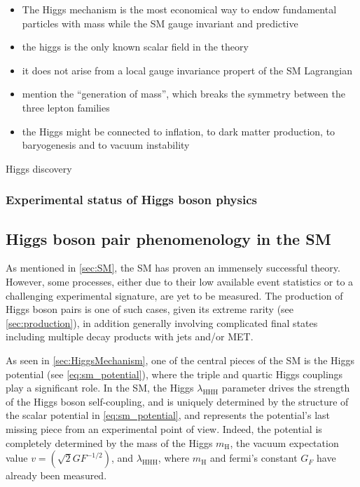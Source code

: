 \documentclass[11pt]{article}
\newcommand{\klthree}{\lambda_{\text{HHH}}}
\newcommand{\mh}{m_{\text{H}}}
\begin{document}
\begin{itemize}
\item The Higgs mechanism is the most economical way to endow fundamental particles with mass while  the SM gauge invariant and predictive
\item the higgs is the only known scalar field in the theory
\item it does not arise from a local gauge invariance propert of the SM Lagrangian
\item mention the ``generation of mass'', which breaks the symmetry between the three lepton families
\item the Higgs might be connected to inflation, to dark matter production, to baryogenesis and to vacuum instability
\end{itemize}


Higgs discovery \cite{CMS_Higgs_discovery1,CMS_Higgs_discovery2,ATLAS_Higgs_discovery}
\subsubsection{Experimental status of Higgs boson physics}
\label{sec:org2be81cc}
\subsection{Higgs boson pair phenomenology in the SM}
\label{sec:org08f759d}
\label{sec:dihiggs}

As mentioned in \cref{sec:SM}, the \ac{SM} has proven an immensely successful theory.
However, some processes, either due to their low available event statistics or to a challenging experimental signature, are yet to be measured.
The production of Higgs boson pairs is one of such cases, given its extreme rarity (see \cref{sec:production}), in addition generally involving complicated final states including multiple decay products with jets and/or \ac{MET}.

As seen in \cref{sec:HiggsMechanism}, one of the central pieces of the SM is the Higgs potential (see \cref{eq:sm_potential}), where the triple and quartic Higgs couplings play a significant role.
In the \ac{SM}, the Higgs \(\klthree\) parameter drives the strength of the Higgs boson self-coupling, and is uniquely determined by the structure of the scalar potential in \cref{eq:sm_potential}, and represents the potential's last missing piece from an experimental point of view.
Indeed, the potential is completely determined by the mass of the Higgs \(\mh\), the vacuum expectation value \(v=(\sqrt{2}G{F}^{-1/2})\), and \(\klthree\), where \(\mh\) and fermi's constant \(G_{F}\) have already been measured.
\end{document}
